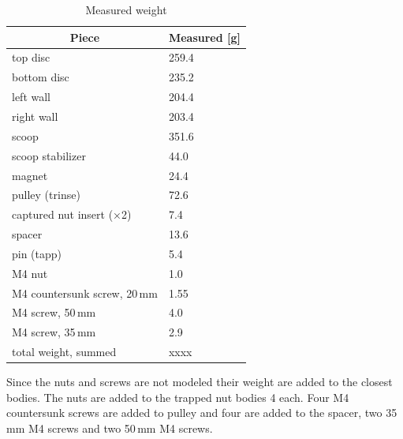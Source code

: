 \begin{table}[H]
	\caption{Measured weight}\label{tab:measure-weight}
	\begin{center}
		\begin{tabular}[c]{l|l}
			\hline
			\multicolumn{1}{c|}{\textbf{Piece}} &
			\multicolumn{1}{c}{\textbf{Measured [g]}}   \\
			\hline
			top disc                            & 259.4 \\
			bottom disc                         & 235.2 \\
			left wall                           & 204.4 \\
			right wall                          & 203.4 \\
			scoop                               & 351.6 \\
			scoop stabilizer                    & 44.0  \\
			magnet                              & 24.4  \\
			pulley (trinse)                     & 72.6  \\
			captured nut insert (×2)            & 7.4   \\
			spacer                              & 13.6  \\
			pin (tapp)                          & 5.4   \\
			M4 nut                              & 1.0   \\
			M4 countersunk screw, 20\,mm        & 1.55  \\
			M4 screw, 50\,mm                    & 4.0   \\
			M4 screw, 35\,mm                    & 2.9   \\
			total weight, summed                & xxxx  \\
			\hline
		\end{tabular}
	\end{center}
\end{table}

Since the nuts and screws are not modeled their weight are added to the closest bodies.
The nuts are added to the trapped nut bodies 4 each.
Four M4 countersunk screws are added to pulley and four are added to the spacer, two 35\,mm M4 screws and two 50\,mm M4 screws.



